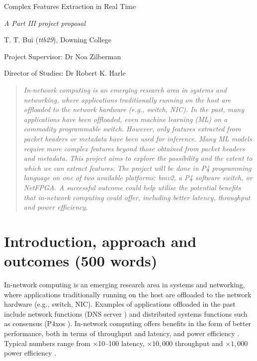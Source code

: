 \documentclass[12pt]{article}
\begin{document}
\centerline{\Large Complex Features Extraction in Real Time}
\vspace{2em}
\centerline{\Large \emph{A Part III project proposal}}
\vspace{2em}
\centerline{\large T. T. Bui (\emph{ttb29}), Downing College}
\vspace{1em}
\centerline{\large Project Supervisor: Dr Noa Zilberman}
\medskip
\centerline{\large Director of Studies: Dr Robert K. Harle}
\vspace{1em}

\begin{abstract}
\textsl{
	In-network computing is an emerging research area in systems and networking, where applications traditionally running on the host are offloaded to the network hardware (e.g., switch, NIC). In the past, many applications have been offloaded, even machine learning (ML) on a commodity programmable switch. However, only features extracted from packet headers or metadata have been used for inference. Many ML models require more complex features beyond those obtained from packet headers and metadata. This project aims to explore the possibility and the extent to which we can extract features. The project will be done in P4 programming language on one of two available platforms: bmv2, a P4 software switch, or NetFPGA. A successful outcome could help utilise the potential benefits that in-network computing could offer, including better latency, throughput and power efficiency.
} 
\end{abstract}

\section{Introduction, approach and outcomes (500 words)}
In-network computing is an emerging research area in systems and networking, where applications traditionally running on the host are offloaded to the network hardware (e.g., switch, NIC). Examples of applications offloaded in the past include network functions (DNS server \cite{dns}) and distributed systems functions such as consensus (P4xos \cite{p4xos, dang16}). In-network computing offers benefits in the form of better performance, both in terms of throughput and latency, and power efficiency \cite{sigarch}. Typical numbers range from $\times$10--100 latency, $\times10,000$ throughput and $\times1,000$ power efficiency \cite{yuta}.\\
\end{document}
